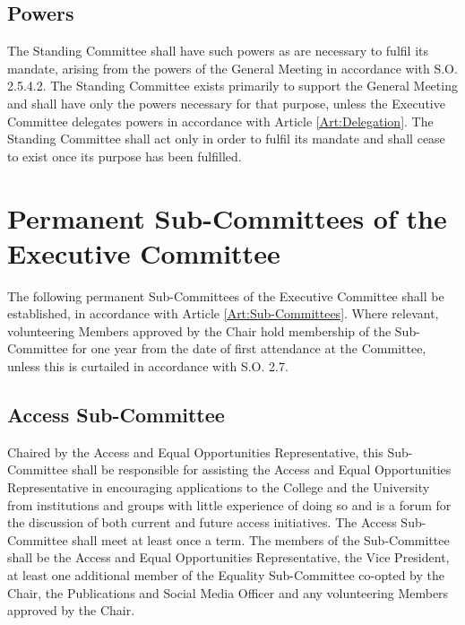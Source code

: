 \subsection{Powers}
\npara The Standing Committee shall have such powers as are necessary to fulfil its mandate, arising from the powers of the General Meeting in accordance with S.O. 2.5.4.2.
\npara The Standing Committee exists primarily to support the General Meeting and shall have only the powers necessary for that purpose, unless the Executive Committee delegates powers in accordance with Article \ref{Art:Delegation}.
\npara The Standing Committee shall act only in order to fulfil its mandate and shall cease to exist once its purpose has been fulfilled.
\section{Permanent Sub-Committees of the Executive Committee}
\npara The following permanent Sub-Committees of the Executive Committee shall be established, in accordance with Article \ref{Art:Sub-Committees}.
\npara Where relevant, volunteering Members approved by the Chair hold membership of the Sub-Committee for one year from the date of first attendance at the Committee, unless this is curtailed in accordance with S.O. 2.7.
\subsection{Access Sub-Committee}
\npara Chaired by the Access and Equal Opportunities Representative, this Sub-Committee shall be responsible for assisting the Access and Equal Opportunities Representative in encouraging applications to the College and the University from institutions and groups with little experience of doing so and is a forum for the discussion of both current and future access initiatives.
\npara The Access Sub-Committee shall meet at least once a term.
\npara The members of the Sub-Committee shall be the Access and Equal Opportunities Representative, the Vice President, at least one additional member of the Equality Sub-Committee co-opted by the Chair, the Publications and Social Media Officer and any volunteering Members approved by the Chair.
